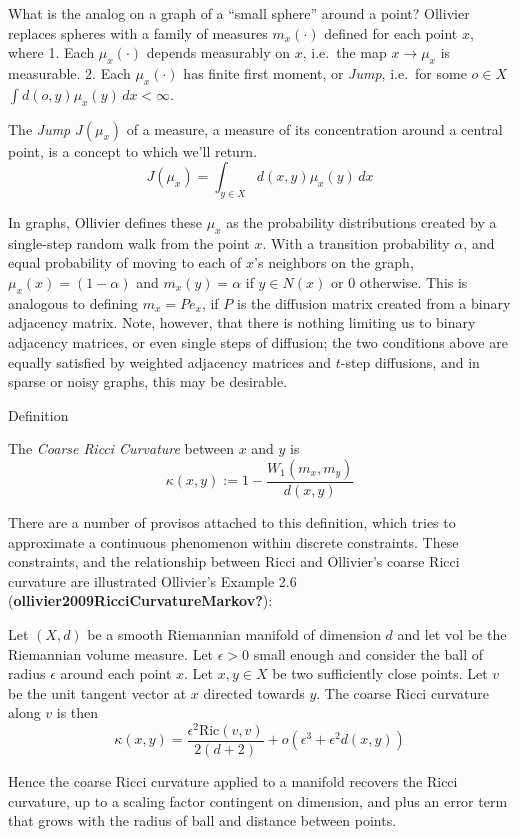 \documentclass[
  letterpaper,
  DIV=11,
  numbers=noendperiod]{scrartcl}
\begin{document}
What is the analog on a graph of a ``small sphere'' around a point?
Ollivier replaces spheres with a family of measures \(m_{x}(\cdot)\)
defined for each point \(x\), where 1. Each \(\mu_{x}(\cdot)\) depends
measurably on \(x\), i.e.~the map \(x \to \mu_{x}\) is measurable. 2.
Each \(\mu_{x}(\cdot)\) has finite first moment, or \emph{Jump},
i.e.~for some \(o \in X\) \(\int d(o,y) \mu_{x}(y) \, dx < \infty\).

The \emph{Jump} \(J(\mu_{x})\) of a measure, a measure of its
concentration around a central point, is a concept to which we'll
return. \[
J(\mu_{x}) = \int_{y \in X} d(x, y) \mu_{x}(y) \, dx 
\]

In graphs, Ollivier defines these \(\mu_x\) as the probability
distributions created by a single-step random walk from the point \(x\).
With a transition probability \(\alpha\), and equal probability of
moving to each of \(x\)'s neighbors on the graph,
\(\mu_{x}(x) = (1-\alpha)\) and \(m_{x}(y) = \alpha\) if \(y \in N(x)\)
or \(0\) otherwise. This is analogous to defining \(m_{x} = P e_{x}\),
if \(P\) is the diffusion matrix created from a binary adjacency matrix.
Note, however, that there is nothing limiting us to binary adjacency
matrices, or even single steps of diffusion; the two conditions above
are equally satisfied by weighted adjacency matrices and \(t\)-step
diffusions, and in sparse or noisy graphs, this may be desirable.

Definition

The \emph{Coarse Ricci Curvature} between \(x\) and \(y\) is
\[\kappa(x, y):=1-\frac{W_1\left(m_x, m_y\right)}{d(x, y)}\]

There are a number of provisos attached to this definition, which tries
to approximate a continuous phenomenon within discrete constraints.
These constraints, and the relationship between Ricci and Ollivier's
coarse Ricci curvature are illustrated Ollivier's Example 2.6
(\textbf{ollivier2009RicciCurvatureMarkov?}):

Let \((X,d)\) be a smooth Riemannian manifold of dimension \(d\) and let
\(\text{vol}\) be the Riemannian volume measure. Let \(\epsilon>0\)
small enough and consider the ball of radius \(\epsilon\) around each
point \(x\). Let \(x,y \in X\) be two sufficiently close points. Let
\(v\) be the unit tangent vector at \(x\) directed towards \(y\). The
coarse Ricci curvature along \(v\) is then
\[\kappa(x,y) = \frac{\epsilon^2 \text{Ric}(v,v)}{2(d+2)}+o(\epsilon^3 + \epsilon^2d(x,y))\]

Hence the coarse Ricci curvature applied to a manifold recovers the
Ricci curvature, up to a scaling factor contingent on dimension, and
plus an error term that grows with the radius of ball and distance
between points.
\end{document}
